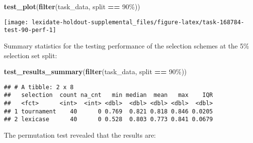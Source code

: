 \documentclass[
]{book}
\newenvironment{Shaded}{\begin{snugshade}}{\end{snugshade}}
\newcommand{\AttributeTok}[1]{\textcolor[rgb]{0.13,0.29,0.53}{#1}}
\newcommand{\DecValTok}[1]{\textcolor[rgb]{0.00,0.00,0.81}{#1}}
\newcommand{\FunctionTok}[1]{\textcolor[rgb]{0.13,0.29,0.53}{\textbf{#1}}}
\newcommand{\NormalTok}[1]{#1}
\newcommand{\OtherTok}[1]{\textcolor[rgb]{0.56,0.35,0.01}{#1}}
\newcommand{\SpecialCharTok}[1]{\textcolor[rgb]{0.81,0.36,0.00}{\textbf{#1}}}
\newcommand{\StringTok}[1]{\textcolor[rgb]{0.31,0.60,0.02}{#1}}
\begin{document}
\begin{Shaded}
\begin{Highlighting}[]
\FunctionTok{test\_plot}\NormalTok{(}\FunctionTok{filter}\NormalTok{(task\_data, split }\SpecialCharTok{==} \StringTok{\textquotesingle{}90\%\textquotesingle{}}\NormalTok{))}
\end{Highlighting}
\end{Shaded}

\texttt{[image: lexidate-holdout-supplemental\_files/figure-latex/task-168784-test-90-perf-1]}

Summary statistics for the testing performance of the selection schemes at the 5\% selection set split:

\begin{Shaded}
\begin{Highlighting}[]
\FunctionTok{test\_results\_summary}\NormalTok{(}\FunctionTok{filter}\NormalTok{(task\_data, split }\SpecialCharTok{==} \StringTok{\textquotesingle{}90\%\textquotesingle{}}\NormalTok{))}
\end{Highlighting}
\end{Shaded}

\begin{verbatim}
## # A tibble: 2 x 8
##   selection  count na_cnt   min median  mean   max    IQR
##   <fct>      <int>  <int> <dbl>  <dbl> <dbl> <dbl>  <dbl>
## 1 tournament    40      0 0.769  0.821 0.818 0.846 0.0205
## 2 lexicase      40      0 0.528  0.803 0.773 0.841 0.0679
\end{verbatim}

The permutation test revealed that the results are:

\begin{Shaded}
\end{Shaded}
\end{document}
